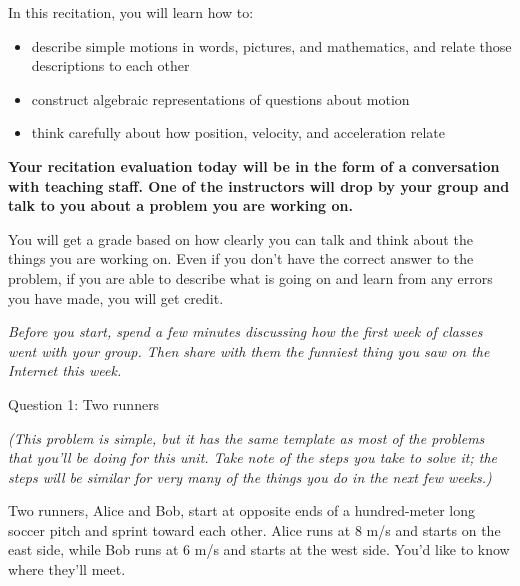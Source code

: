 \documentclass[12pt]{article}
\newcommand{\BI}{\begin{itemize}}
\newcommand{\EI}{\end{itemize}}
\def\BS{\bigskip}
\begin{document}
\Large
\centerline{}
\normalsize
\centerline{}

\medskip

\BS\BS\BS

\begin{minipage}{0.40\textwidth}
\Large

In this recitation, you will learn how to:

\BI
\item describe simple motions in words, pictures, and mathematics, and relate those descriptions to each other
\item construct algebraic representations of questions about motion
\item think carefully about how position, velocity, and acceleration relate
\EI


\end{minipage}
\hspace{0.15\textwidth}
\begin{minipage}{0.40\textwidth}


\large
\bf Your recitation evaluation today will be in the form of a conversation with teaching staff. One of the instructors will drop by your group and talk to you about a problem you are working on.
\BS


You will get a grade based on how clearly you can talk and think about the things you are working on. Even if you don't have the correct answer to the problem, if you are able to describe what is going on and learn from any errors you have made, you will get credit.

	
	
\end{minipage}

\vfill

\normalsize

\it Before you start, spend a few minutes discussing how the first week of classes went with your group. Then share with them the funniest thing you saw on the Internet this week. 

\newpage

\centerline{\Large Question 1: Two runners}

\begin{center}
\it (This problem is simple, but it has the same template as most of the problems that you'll be doing for this unit. Take note of the steps you take to solve it; the steps will be similar for very many of the things you do in the next few weeks.)

\end{center}
\rm
Two runners, Alice and Bob, start at opposite ends of a hundred-meter long soccer pitch and sprint toward each other. Alice runs at 8 m/s and starts on the east side, while Bob runs at 6 m/s and starts at the west side. You'd like to know where they'll meet.
\end{document}
